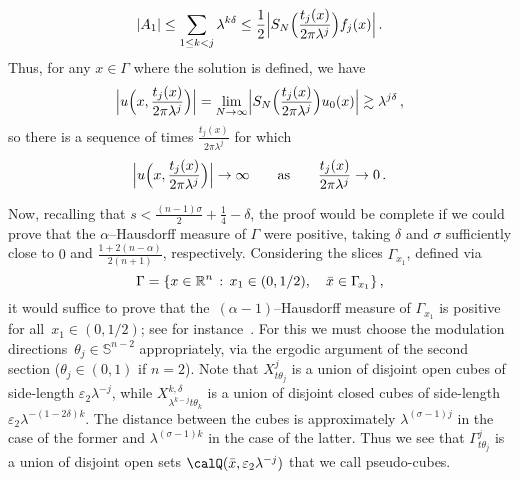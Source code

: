 \documentclass[biblatex]{pzorin-note}
\begin{document}
\[
\abs{ A_1} \leq \sum_{1 \leq k < j} \lambda^{k \delta } \leq \frac{1}{2}\abs[\Big]{ S_{N} \Big(\frac{t_{j}(x)}{2\pi \lambda^{j}} \Big) f_j(x)} \, .
\]
Thus, for any $x \in \Gamma $ where the solution is defined, we have
\begin{equation*}
\abs[\Big]{ u \Big(x, \frac{t_{j}(x)}{2\pi \lambda^{j}}\Big) }
= \lim_{N \to \infty}
\abs[\Big]{ S_{N} \Big( \frac{t_{j}(x)}{2\pi \lambda^{j}} \Big) u_0(x) } \gtrsim \lambda^{j \delta } \, ,
\end{equation*}
so
there is a sequence of times $\frac{ t_{j}(x)}{2\pi \lambda^{j}}$
for which
\[
\abs[\Big]{ u \Big( x,\frac{t_{j}(x)}{2\pi \lambda^{j}}\Big) } \to \infty \qquad \mbox{as} \qquad \frac{t_{j}(x)}{2\pi \lambda^{j}} \to 0 \, .
\]

Now, recalling that
$ s < \frac{(n-1) \sigma}{2}+\frac{1}{4} - \delta$, the proof would be complete if we
could prove that the $\alpha$--Hausdorff measure of $\Gamma$
were positive, taking $\delta$ and $\sigma$ sufficiently close to $0$ and $\frac{1+2(n-\alpha) }{2(n+1)}$, respectively. Considering the slices $\Gamma_{\!x_1}$, defined via
\[
\Gamma=\left\{x\in\R^n \, : \, x_1\in(0,1/2),\quad \bar{x}\in\Gamma_{\!x_1}\right\},
\]
it would
suffice to prove that the~$(\alpha-1)$--Hausdorff measure of $\Gamma_{\!x_1}$ is positive for all~$x_1\in(0,1/2)$; see
for instance~\cite[Proposition~7.9]{Falconer2}.
For this we must choose the modulation directions~$\theta_{j} \in \mathbb{S}^{n-2}$ appropriately, via the ergodic argument of the second section ($\theta_{j} \in (0,1)$ if $n=2$).
Note that $X_{t\theta_{j}}^{j}$ is a union of disjoint open cubes of side-length $\varepsilon_{2} \lambda^{-j}$,
while $X^{k, \delta}_{\lambda^{k-j} t\theta_{k}}$ is a union of disjoint closed cubes of side-length $\varepsilon_{2} \lambda^{-(1 - 2\delta)k}$. The
distance between the cubes is approximately $\lambda^{(\sigma-1)j}$ in the case of the former and $\lambda^{(\sigma-1)k}$ in the case of the latter.
Thus we see that
$\Gamma_{\!t\theta_{j}}^{j}$ is a union of disjoint open sets $\calQ(\bar{x}, \varepsilon_{2} \lambda^{-j})$ that we call pseudo-cubes.
\end{document}
